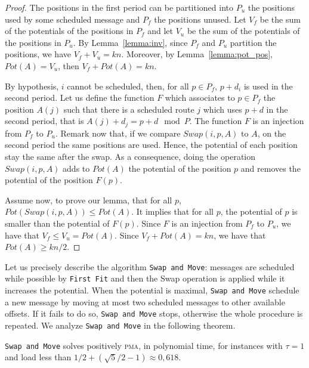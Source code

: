 \documentclass[a4paper,cleveref, autoref, thm-restate,UKenglish]{lipics-v2019}
\newcommand\pma{\textsc{pma}\xspace}
\newcommand\firstfit{\texttt{First Fit}\xspace}
\newcommand\swapandmove{\texttt{Swap and Move}\xspace}
\begin{document}
\begin{proof}
The positions in the first period can be partitioned into $P_{u}$ the positions used by some scheduled message and $P_{f}$ the positions unused.
Let $V_f$ be the sum of the potentials of the positions in $P_f$ and let $V_u$ be the sum of the potentials of the positions in $P_u$. By Lemma~\ref{lemma:inv}, since $P_f$ and $P_u$ partition the positions, we have $V_f + V_u = kn$. Moreover, by Lemma~\ref{lemma:pot_pos}, $Pot(A) = V_u$, then $V_f + Pot(A) = kn$.

By hypothesis, $i$ cannot be scheduled, then, for all $p \in P_{f}$, $p+d_i$ is used in the second period. Let us define the function $F$ which associates to $p \in P_{f}$ the position $A(j)$ such that there is a scheduled route $j$ which uses $p+d$ in the second period, that is $A(j) + d_j = p + d \mod P$. The function $F$ is an injection from $P_{f}$ to $P_u$. Remark now that, if we compare $Swap(i,p,A)$ to $A$, on the second period the same positions are used. Hence, the potential of each position stay the same after the swap. As a consequence, doing the operation $Swap(i,p,A)$ adds to $Pot(A)$ the potential of the position $p$ and removes the potential of the position $F(p)$. 

Assume now, to prove our lemma, that for all $p$, $Pot(Swap(i,p,A)) \leq Pot(A)$. It implies that for all $p$, the potential of $p$ is smaller than the potential of $F(p)$. Since $F$ is an injection from $P_f$ to $P_u$, we have that $V_f \leq V_u = Pot(A)$. Since $V_f + Pot(A) = kn$, we have that $Pot(A) \geq kn/2$.
\end{proof}



Let us precisely describe the algorithm \swapandmove:  messages are scheduled while possible by \firstfit and then the Swap operation is applied while it increases the potential. When the potential is maximal, \swapandmove schedule a new message by moving at most two scheduled messages to other available offsets. If it fails to do so, \swapandmove stops, otherwise the whole procedure is repeated. We analyze \swapandmove in the following theorem.

\begin{theorem}
\swapandmove solves positively \pma, in polynomial time, for instances with $\tau =1$ and load less than $1/2 + (\sqrt{5}/2 -1) \approx 0,618$.
\end{theorem}
\end{document}
